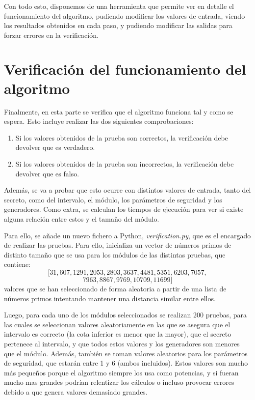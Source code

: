 Con todo esto, disponemos de una herramienta que permite ver en detalle el funcionamiento del algoritmo, pudiendo modificar los valores de entrada, viendo los resultados obtenidos en cada paso, y pudiendo modificar las salidas para forzar errores en la verificación.

\section{Verificación del funcionamiento del algoritmo} \label{sec:verificacion}

Finalmente, en esta parte se verifica que el algoritmo funciona tal y como se espera. Esto incluye realizar las dos siguientes comprobaciones:
\begin{enumerate}
    \item Si los valores obtenidos de la prueba son correctos, la verificación debe devolver que es verdadero.

    \item Si los valores obtenidos de la prueba son incorrectos, la verificación debe devolver que es falso.
\end{enumerate}

Además, se va a probar que esto ocurre con distintos valores de entrada, tanto del secreto, como del intervalo, el módulo, los parámetros de seguridad y los generadores. Como extra, se calculan los tiempos de ejecución para ver si existe alguna relación entre estos y el tamaño del módulo.

Para ello, se añade un nuevo fichero a Python, \emph{verification.py}, que es el encargado de realizar las pruebas. Para ello, inicializa un vector de números primos de distinto tamaño que se usa para los módulos de las distintas pruebas, que contiene:
$$[31, 607, 1291, 2053, 2803, 3637, 4481, 5351, 6203, 7057,$$ $$7963, 8867, 9769, 10709, 11699]$$
valores que se han seleccionado de forma aleatoria a partir de una lista de números primos intentando mantener una distancia similar entre ellos.

Luego, para cada uno de los módulos seleccionados se realizan 200 pruebas, para las cuales se seleccionan valores aleatoriamente en las que se asegura que el intervalo es correcto (la cota inferior es menor que la mayor), que el secreto pertenece al intervalo, y que todos estos valores y los generadores son menores que el módulo. Además, también se toman valores aleatorios para los parámetros de seguridad, que estarán entre 1 y 6 (ambos incluidos). Estos valores son mucho más pequeños porque el algoritmo siempre los usa como potencias, y si fueran mucho mas grandes podrían relentizar los cálculos o incluso provocar errores debido a que genera valores demasiado grandes.

